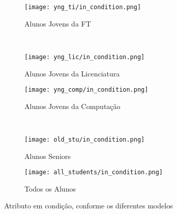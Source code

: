 \clearpage
\begin{figure}[!ht]
    \centering
    \begin{subfigure}[b]{0.48\textwidth}
        \centering
        \texttt{[image: yng\_ti/in\_condition.png]}
        \caption{Alunos Jovens da FT}
    \end{subfigure}
    ~
    \begin{subfigure}[b]{0.48\textwidth}
        \centering
        \texttt{[image: yng\_lic/in\_condition.png]}
        \caption{Alunos Jovens da Licenciatura}
    \end{subfigure}

    \begin{subfigure}[b]{0.48\textwidth}
        \centering
        \texttt{[image: yng\_comp/in\_condition.png]}
        \caption{Alunos Jovens da Computação}
    \end{subfigure}
    ~
    \begin{subfigure}[b]{0.48\textwidth}
        \centering
        \texttt{[image: old\_stu/in\_condition.png]}
        \caption{Alunos Seniors}
    \end{subfigure}

    \begin{subfigure}[b]{0.48\textwidth}
        \centering
        \texttt{[image: all\_students/in\_condition.png]}
        \caption{Todos os Alunos}
    \end{subfigure}
    \caption{Atributo em condição, conforme os diferentes modelos}
\end{figure}

